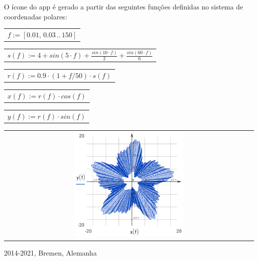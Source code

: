 \documentclass[DIV=calc, paper=a4, fontsize=11pt, twocolumn]{scrartcl}
\begin{document}
O ícone do app é gerado a partir das
seguintes funções definidas no sistema
de coordenadas polares:
\begin{center}\begin{tabular}{c}
                $f := \left[ 0.01,\, 0.03 \,..\, 150 \right]$
\end{tabular}\end{center}
\begin{center}\begin{tabular}{c}
                $s(f) := 4 + sin \left( 5 \cdot f\right)  + \frac{sin \left( 10 \cdot f\right) }{2} + \frac{sin \left( 60 \cdot f\right) }{6}$
\end{tabular}\end{center}
\begin{center}\begin{tabular}{c}
                $r(f) := 0.9 \cdot \left( 1 + f / 50 \right) \cdot s \left( f\right) $
\end{tabular}\end{center}
\begin{center}\begin{tabular}{c}
                $x(f) := r \left( f\right)  \cdot cos \left( f\right) $
\end{tabular}\end{center}
\begin{center}\begin{tabular}{c}
                $y(f) := r \left( f\right)  \cdot sin \left( f\right) $
\end{tabular}\end{center}
\begin{center}\begin{tabular}{c} \includegraphics[width=0.45\textwidth]{graphics/about_micromath_fig1.png} \end{tabular}\end{center}

2014-2021, Bremen, Alemanha
\end{document}
